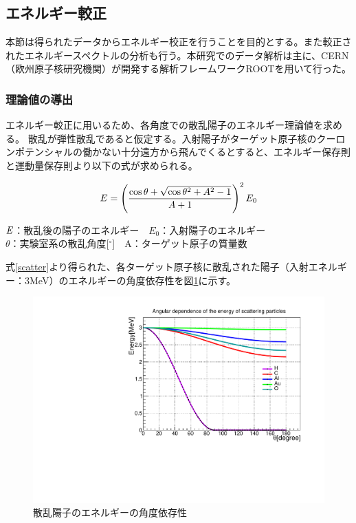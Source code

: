 \documentclass[a4paper,11pt,dvipdfmx]{jsarticle}
\begin{document}
\subsection{エネルギー較正}
本節は得られたデータからエネルギー校正を行うことを目的とする。また較正されたエネルギースペクトルの分析も行う。本研究でのデータ解析は主に、CERN（欧州原子核研究機関）が開発する解析フレームワークROOTを用いて行った。

\subsubsection{理論値の導出}
エネルギー較正に用いるため、各角度での散乱陽子のエネルギー理論値を求める。
散乱が弾性散乱であると仮定する。入射陽子がターゲット原子核のクーロンポテンシャルの働かない十分遠方から飛んでくるとすると、エネルギー保存則と運動量保存則より以下の式が求められる。


\begin{equation}
\centering
\large
  E = \left( \frac{\cos\theta+\sqrt{\cos\theta^2+A^2-1}}{A+1} \right)^2 E_0
  \label{scatter}
\end{equation}

\vspace*{2mm}

\begin{center}
\begin{small}
  $\it{E}$：散乱後の陽子のエネルギー　$E_0$：入射陽子のエネルギー\\
  $\theta$：実験室系の散乱角度[$^\circ$]　A：ターゲット原子の質量数
\end{small}
\end{center} 

\vspace*{5mm}
\noindent
式\ref{scatter}より得られた、各ターゲット原子核に散乱された陽子（入射エネルギー：3MeV）のエネルギーの角度依存性を図\ref{angleE}に示す。

\begin{figure}[H]
\centering
\includegraphics[width=120mm]{picture/cali/protonE.pdf}
\caption{散乱陽子のエネルギーの角度依存性}
\label{angleE}
\end{figure}
\end{document}
